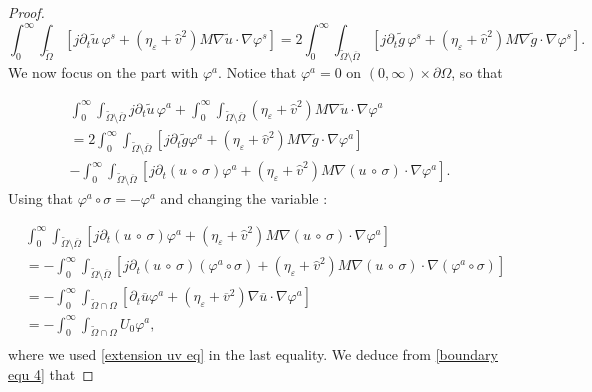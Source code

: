 \documentclass[10pt,a4paper]{amsart}
\begin{document}
\begin{proof}
\begin{equation}\label{boundary equ 3}
\int_0^\infty \int_{\widetilde{\Omega}}\left[ j \partial_t \widetilde{u} \,\varphi^s + (\eta_\varepsilon + \hat{v}^2) M \nabla \widetilde{u} \cdot \nabla \varphi^s\right] =  2\int_0^\infty \int_{\widetilde{\Omega}\setminus \overline{\Omega}}\left[ j\partial_t \widetilde{g} \,\varphi^s +(\eta_\varepsilon + \hat{v}^2)M\nabla \widetilde{g} \cdot \nabla \varphi ^s\right].
\end{equation}
We now focus on the part with $\varphi^a$. Notice that $\varphi^a =0$ on $(0,\infty) \times \partial\Omega$, so that  

\begin{multline}\label{boundary equ 4}
\int_0^\infty\int_{\widetilde{\Omega}\setminus \overline{\Omega}} j \partial_t \widetilde{u}\, \varphi^a  + \int_0^\infty\int_{\widetilde{\Omega}\setminus \overline{\Omega}} (\eta_\varepsilon + \hat{v}^2 ) M\nabla \widetilde{u} \cdot \nabla \varphi^a \\
= 2\int_0^\infty \int_{\widetilde{\Omega}\setminus \overline{\Omega}} \left[ j\partial_t \widetilde{g} \varphi^a +(\eta_\varepsilon + \hat{v}^2)M\nabla \widetilde{g} \cdot \nabla \varphi ^a \right]\\
 - \int_0^\infty\int_{\widetilde{\Omega}\setminus \overline{\Omega}} \left[ j\partial_t (u\, \circ \,\sigma) \varphi^a + (\eta_\varepsilon + \hat{v}^2)M\nabla (u\, \circ \,\sigma) \cdot \nabla \varphi ^a \right].
\end{multline}
Using that $\varphi^a \circ \sigma = -\varphi^a$ and changing the variable : 

\begin{align*}
&\int_0^\infty\int_{\widetilde{\Omega}\setminus \overline{\Omega}} \left[j\partial_t (u\, \circ \,\sigma) \varphi^a + (\eta_\varepsilon + \hat{v}^2)M\nabla (u\, \circ \,\sigma) \cdot \nabla \varphi ^a\right]\\
&= -\int_0^\infty\int_{\widetilde{\Omega}\setminus \overline{\Omega}}\left[ j\partial_t (u\, \circ \,\sigma) (\varphi^a \circ \sigma) + (\eta_\varepsilon + \hat{v}^2)M\nabla (u\, \circ \,\sigma) \cdot \nabla (\varphi ^a \circ \sigma)\right]\\
&= -\int_0^\infty\int_{\widetilde{\Omega}\cap \Omega}\left[ \partial_t \overline{u} \varphi^a + (\eta_\varepsilon + \overline{v}^2) \nabla \overline{u} \cdot \nabla \varphi^a\right] \\
&=-\int_0^\infty\int_{\widetilde{\Omega}\cap \Omega} U_0 \varphi^a,\\
\end{align*}
where we used \eqref{extension uv eq} in the last equality. 
We deduce from \eqref{boundary equ 4} that 


\end{proof}
\end{document}
